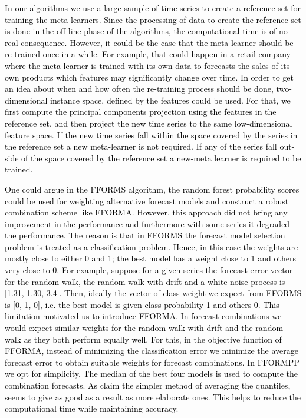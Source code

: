 \documentclass{monashthesis}
\begin{document}
\textcolor{black}{In our algorithms we use a large sample of time series to create a reference set for training the meta-learners. Since the processing of data to create the reference set is done in the off-line phase of the algorithms, the computational time is of no real consequence.  However, it could be the case that the meta-learner should be re-trained once in a while. For example, that could happen in a retail company where the meta-learner is trained with its own data to forecasts the sales of its own products which features may significantly change over time. In order to get an idea about when and how often the re-training process should be done, two-dimensional instance space, defined by the features could be used. For that, we first compute the principal components projection using the features in the reference set, and then project the new time series to the same low-dimensional feature space. If the new time series fall within the space covered by the series in the reference set a new meta-learner is not required. If any of the series fall out-side of the space covered by the reference set a new-meta learner is required to be trained.}

\textcolor{black}{One could argue in the FFORMS algorithm, the random forest probability scores  could be used for weighting alternative forecast models and construct a robust combination scheme like FFORMA. However, this approach did not bring any improvement in the performance and furthermore with some series it degraded the performance. The reason is that in FFORMS the forecast model selection problem is treated as a classification problem. Hence, in this case the weights are mostly close to either 0 and 1; the best model has a weight close to 1 and others very close to 0. For example, suppose for a given series the forecast error vector for the random walk, the random walk with drift and a white noise process is [1.31, 1.30, 3.4]. Then, ideally the vector of class weight we expect from FFORMS is [0, 1, 0], i.e. the best model is given class probability 1 and others 0. This limitation motivated us to introduce FFORMA. In forecast-combinations we would expect similar weights for the random walk with drift and the random walk as they both perform equally well. For this, in the objective function of FFORMA, instead of minimizing the classification error we minimize the average forecast error to obtain suitable weights for forecast combinations.} \textcolor{black}{In FFORMPP we opt for simplicity. The median of the best four models is used to compute the combination forecasts. As} \textcite{lichtendahl2013better} \textcolor{black}{claim the simpler method
of averaging the quantiles, seems to give as good as a result as more elaborate ones. This helps to reduce the computational time while maintaining accuracy.}
\end{document}
